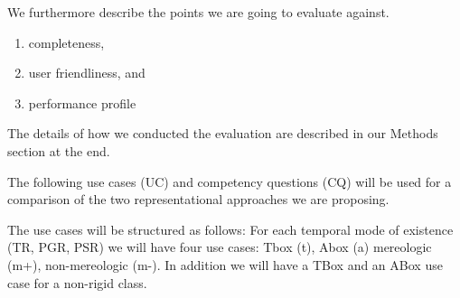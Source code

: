 We furthermore describe the points we are going to evaluate against.
\begin{enumerate}
    \item completeness,
    \item user friendliness, and
    \item performance profile
\end{enumerate}
The details of how we conducted the evaluation are described in our Methods section at the end.




The following use cases (UC) and competency questions (CQ) will be used for a comparison of the two representational approaches we are proposing. 

The use cases will be structured as follows: For each temporal mode of existence (TR, PGR, PSR) we will have four use cases: Tbox (t), Abox (a) mereologic (m+), non-mereologic (m-). In addition we will have a TBox and an ABox use case for a non-rigid class. 

